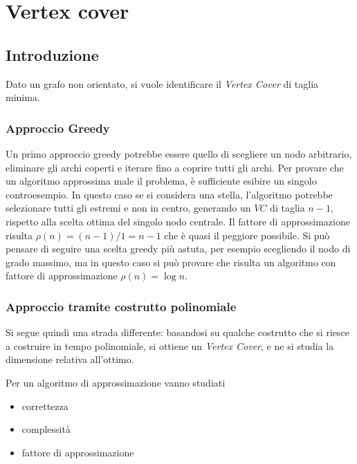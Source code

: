 \section{Vertex cover}

\subsection{Introduzione}

Dato un grafo non orientato, si vuole identificare il \emph{Vertex Cover} di taglia minima.

\subsubsection{Approccio Greedy}

Un primo approccio greedy potrebbe essere quello di scegliere un nodo arbitrario, eliminare gli archi coperti e iterare fino a coprire tutti gli archi.
Per provare che un algoritmo approssima male il problema, è sufficiente esibire un singolo controesempio.
In questo caso se si considera una stella, l'algoritmo potrebbe selezionare tutti gli estremi e non in centro, generando un $VC$ di taglia $n-1$, rispetto alla scelta ottima del singolo nodo centrale.
Il fattore di approssimazione risulta $
\rho (n) = 
(n-1)/1 = n-1
$ che è quasi il peggiore possibile.
Si può pensare di seguire una scelta greedy più astuta, per esempio scegliendo il nodo di grado massimo, ma in questo caso si può provare che risulta un algoritmo con fattore di approssimazione $
\rho (n) = \log n
$.

\subsubsection{Approccio tramite costrutto polinomiale}

Si segue quindi una strada differente: basandosi su qualche costrutto che si riesce a costruire in tempo polinomiale, si ottiene un \emph{Vertex Cover}, e ne si studia la dimensione relativa all'ottimo.

Per un algoritmo di approssimazione vanno studiati
\begin{itemize}[noitemsep,parsep=0pt,partopsep=0pt,topsep=0pt]
    \item correttezza
    \item complessità
    \item fattore di approssimazione
\end{itemize}

